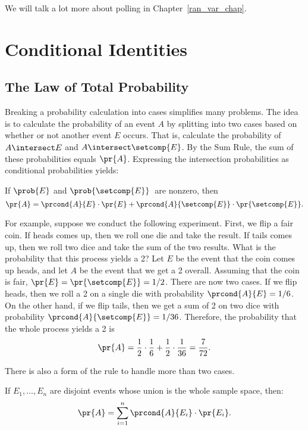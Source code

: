 We will talk a lot more about polling in Chapter~\ref{ran_var_chap}.

\section{Conditional Identities}

\subsection{The Law of Total Probability}\label{sec:total_probability}

Breaking a probability calculation into cases simplifies many
problems.  The idea is to calculate the probability of an event $A$ by
splitting into two cases based on whether or not another event $E$
occurs.  That is, calculate the probability of $A\nobreak
\intersect\nobreak E$ and $A \intersect \setcomp{E}$.  By the Sum
Rule, the sum of these probabilities equals $\pr{A}$.  Expressing the
intersection probabilities as conditional probabilities yields:
\begin{rul*}\label{total_prob_Ebar}
If $\prob{E}$ and $\prob{\setcomp{E}}$~are nonzero, then
\[
\pr{A} = \prcond{A}{E} \cdot \pr{E} +
         \prcond{A}{\setcomp{E}} \cdot \pr{\setcomp{E}}.
\]
\end{rul*}

For example, suppose we conduct the following experiment.  First, we
flip a fair coin.  If heads comes up, then we roll one die and take the
result.  If tails comes up, then we roll two dice and take the sum of
the two results.  What is the probability that this process yields a
2?  Let $E$ be the event that the coin comes up heads, and let $A$ be
the event that we get a 2 overall.  Assuming that the coin is fair,
$\pr{E} = \pr{\setcomp{E}} = 1/2$.  There are now two cases. If we
flip heads, then we roll a 2 on a single die with probability
$\prcond{A}{E} = 1/6$.  On the other hand, if we flip tails, then we
get a sum of 2 on two dice with probability
$\prcond{A}{\setcomp{E}} = 1/36$.  Therefore, the probability that
the whole process yields a 2 is
\[
\pr{A} = \frac{1}{2} \cdot \frac{1}{6} + \frac{1}{2} \cdot \frac{1}{36} =
  \frac{7}{72}.
\]

There is also a form of the rule to handle more than two cases.
\begin{rul*}
If $E_1, \dots, E_n$ are disjoint events whose union is the whole
sample space, then:
\[
\pr{A} = \sum_{i=1}^{n} \prcond{A}{E_i} \cdot \pr{E_i}.
\]
\end{rul*}

